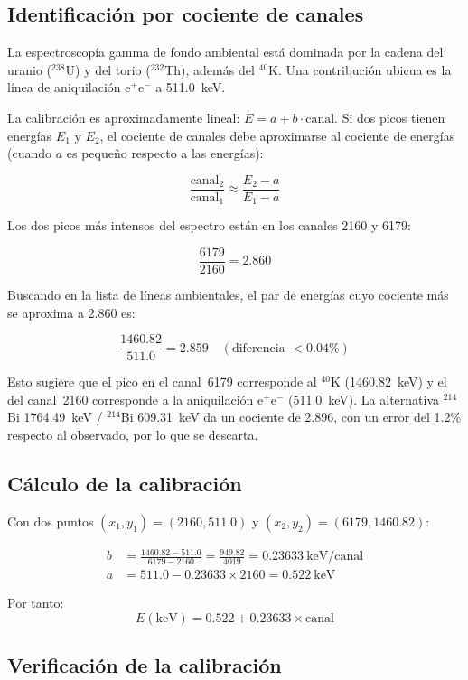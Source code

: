 \documentclass[10pt,a4paper]{article}
\begin{document}
\subsection{Identificaci\'on por cociente de canales}

La espectroscop\'ia gamma de fondo ambiental est\'a dominada por la cadena del uranio ($^{238}$U)
y del torio ($^{232}$Th), adem\'as del $^{40}$K. Una contribuci\'on ubicua es la l\'inea de
aniquilaci\'on e$^+$e$^-$ a 511.0~keV.

La calibraci\'on es aproximadamente lineal: $E = a + b\cdot\text{canal}$. Si dos picos
tienen energ\'ias $E_1$ y $E_2$, el cociente de canales debe aproximarse al cociente de energ\'ias
(cuando $a$ es peque\~no respecto a las energ\'ias):

\[
\frac{\text{canal}_2}{\text{canal}_1} \approx \frac{E_2 - a}{E_1 - a}
\]

Los dos picos m\'as intensos del espectro est\'an en los canales 2160 y 6179:

\[
\frac{6179}{2160} = 2.860
\]

Buscando en la lista de l\'ineas ambientales, el par de energ\'ias cuyo cociente m\'as se
aproxima a 2.860 es:

\[
\frac{1460.82}{511.0} = 2.859 \quad (\text{diferencia } <0.04\%)
\]

Esto sugiere que el pico en el canal~6179 corresponde al $^{40}$K (1460.82~keV) y el del
canal~2160 corresponde a la aniquilaci\'on e$^+$e$^-$ (511.0~keV). La alternativa
$^{214}$Bi 1764.49~keV / $^{214}$Bi 609.31~keV da un cociente de 2.896, con un error
del 1.2\% respecto al observado, por lo que se descarta.

\subsection{C\'alculo de la calibraci\'on}

Con dos puntos $(x_1,y_1) = (2160, 511.0)$ y $(x_2,y_2) = (6179, 1460.82)$:

\begin{align*}
b &= \frac{1460.82 - 511.0}{6179 - 2160}
   = \frac{949.82}{4019}
   = 0.23633~\text{keV/canal} \\[4pt]
a &= 511.0 - 0.23633 \times 2160
   = 0.522~\text{keV}
\end{align*}

Por tanto:
\[
E(\text{keV}) = 0.522 + 0.23633 \times \text{canal}
\]

\subsection{Verificaci\'on de la calibraci\'on}
\end{document}
